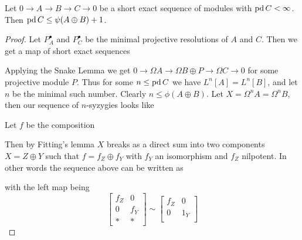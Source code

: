 \begin{theorem}\cite[Theorem~4]{IgTo05} \label{thm:projdim_bounded_by_psi}
	Let $0 \to A \to B \to C \to 0$ be a short exact sequence of modules with $\pd C < \infty$. Then $\pd C \leq \psi(A\oplus B)+1$.
	\begin{proof}
		Let $P_A^\bullet$ and $P_C^\bullet$ be the minimal projective resolutions of $A$ and $C$. Then we get a map of short exact sequences
		\begin{center}
		\end{center}
		Applying the Snake Lemma we get $0 \to \Omega A \to \Omega B \oplus P \to \Omega C \to 0$ for some projective module $P$. Thus for some $n \leq \pd C$ we have $L^n[A] = L^n[B]$, and let $n$ be the minimal such number. Clearly $n \leq \phi(A\oplus B
			)$. Let $X = \Omega^n A = \Omega^n B$, then our sequence of $n$-syzygies looks like
		\begin{center}
		\end{center}
		Let $f$ be the composition
		Then by Fitting's lemma $X$ breaks as a direct sum into two components $X = Z \oplus Y$ such that $f = f_Z \oplus f_Y$ with $f_Y$ an isomorphism and $f_Z$ nilpotent. In other words the sequence above can be written as
		\begin{center}
		\end{center}
		with the left map being
		$$\begin{bmatrix}
			f_Z & 0\\
			0 & f_Y\\
			* & *
		\end{bmatrix} \sim
		\begin{bmatrix}
		f_Z & 0\\
		0 & 1_Y\\

\end{bmatrix}$$
\end{proof}
\end{theorem}
